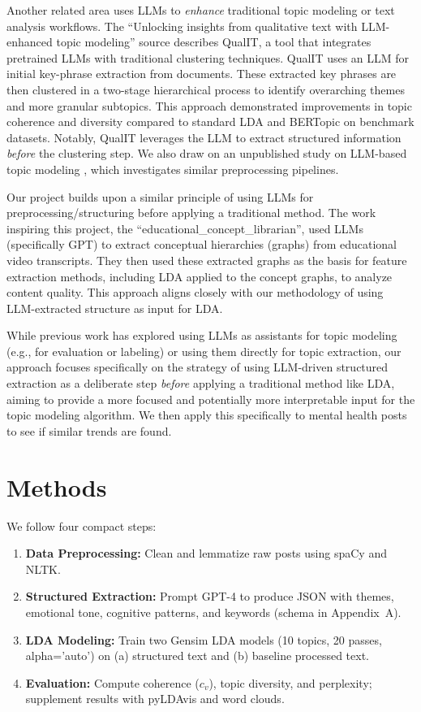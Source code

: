 \documentclass{article}
\begin{document}
Another related area uses LLMs to \emph{enhance} traditional topic modeling or text analysis workflows. The ``Unlocking insights from qualitative text with LLM-enhanced topic modeling'' source \citep{Bhaduri2024QualIT} describes QualIT, a tool that integrates pretrained LLMs with traditional clustering techniques. QualIT uses an LLM for initial key-phrase extraction from documents. These extracted key phrases are then clustered in a two-stage hierarchical process to identify overarching themes and more granular subtopics. This approach demonstrated improvements in topic coherence and diversity compared to standard LDA and BERTopic on benchmark datasets. Notably, QualIT leverages the LLM to extract structured information \emph{before} the clustering step. We also draw on an unpublished study on LLM-based topic modeling \citep{Mu2024LLM}, which investigates similar preprocessing pipelines.

Our project builds upon a similar principle of using LLMs for preprocessing/structuring before applying a traditional method. The work inspiring this project, the ``educational\_concept\_librarian'', used LLMs (specifically GPT) to extract conceptual hierarchies (graphs) from educational video transcripts. They then used these extracted graphs as the basis for feature extraction methods, including LDA applied to the concept graphs, to analyze content quality. This approach aligns closely with our methodology of using LLM-extracted structure as input for LDA.

While previous work has explored using LLMs as assistants for topic modeling (e.g., for evaluation or labeling) or using them directly for topic extraction, our approach focuses specifically on the strategy of using LLM-driven structured extraction as a deliberate step \emph{before} applying a traditional method like LDA, aiming to provide a more focused and potentially more interpretable input for the topic modeling algorithm. We then apply this specifically to mental health posts to see if similar trends are found.

\section{Methods}
We follow four compact steps:
\begin{enumerate}[leftmargin=*]
    \item \textbf{Data Preprocessing:} Clean and lemmatize raw posts using spaCy and NLTK.
    \item \textbf{Structured Extraction:} Prompt GPT-4 to produce JSON with themes, emotional tone, cognitive patterns, and keywords (schema in Appendix~A).
    \item \textbf{LDA Modeling:} Train two Gensim LDA models (10 topics, 20 passes, alpha='auto') on (a) structured text and (b) baseline processed text.
    \item \textbf{Evaluation:} Compute coherence ($c_v$), topic diversity, and perplexity; supplement results with pyLDAvis and word clouds.
\end{enumerate}
\end{document}
